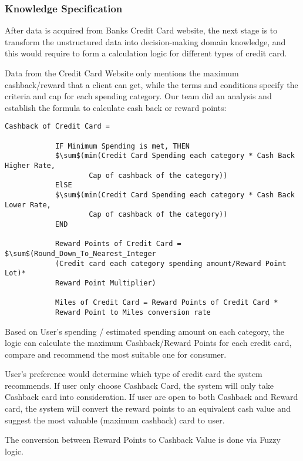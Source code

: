 	\subsubsection{Knowledge Specification} %
	\label{ssub:knowledge_specification}
		After data is acquired from Banks Credit Card website, the next stage is to transform the unstructured data into decision-making domain knowledge, and this would require to form a calculation logic for different types of credit card.

		Data from the Credit Card Website only mentions the maximum cashback/reward that a client can get, while the terms and conditions specify the criteria and cap for each spending category. Our team did an analysis and establish the formula to calculate cash back or reward points:

		\lstset{basicstyle=\footnotesize\ttfamily}
		\begin{lstlisting}[frame=single, gobble=11, tabsize=4, showstringspaces=false, mathescape]
			Cashback of Credit Card =

			IF Minimum Spending is met, THEN
			$\sum$(min(Credit Card Spending each category * Cash Back Higher Rate,
					Cap of cashback of the category))
			ElSE
			$\sum$(min(Credit Card Spending each category * Cash Back Lower Rate,
					Cap of cashback of the category))
			END

			Reward Points of Credit Card = $\sum$(Round_Down_To_Nearest_Integer
			(Credit card each category spending amount/Reward Point Lot)*
			Reward Point Multiplier)

			Miles of Credit Card = Reward Points of Credit Card *
			Reward Point to Miles conversion rate
		\end{lstlisting}

		Based on User’s spending / estimated spending amount on each category, the logic can calculate the maximum Cashback/Reward Points for each credit card, compare and recommend the most suitable one for consumer.

		User’s preference would determine which type of credit card the system recommends. If user only choose Cashback Card, the system will only take Cashback card into consideration. If user are open to both Cashback and Reward card, the system will convert the reward points to an equivalent cash value and suggest the most valuable (maximum cashback) card to user.

		The conversion between Reward Points to Cashback Value is done via Fuzzy logic.

